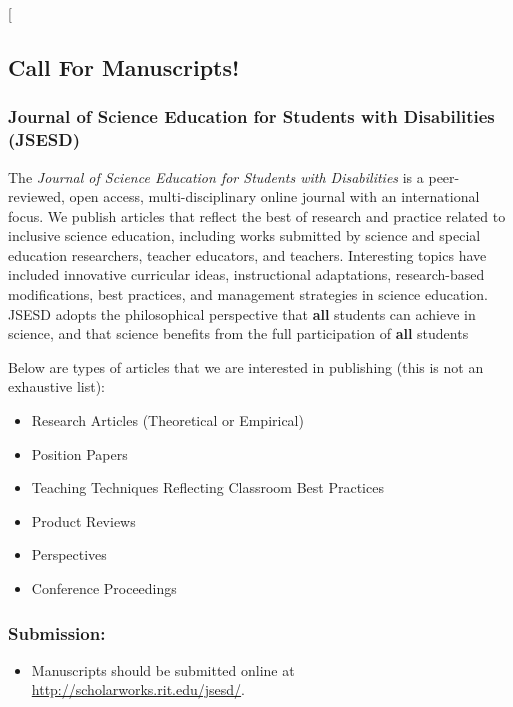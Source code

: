\documentclass[11pt]{sig-alternate}
\begin{document}
\twocolumn[
\begin{@twocolumnfalse}
\section*{Call For Manuscripts!}

\subsubsection*{Journal of Science Education for Students with Disabilities (JSESD)}

The \textit{Journal of Science Education for Students with Disabilities} is a peer-reviewed, open access, multi-disciplinary online journal with an international focus. We publish articles that reflect the best of research and practice related to inclusive science education, including works submitted by science and special education researchers, teacher educators, and teachers. Interesting topics have included innovative curricular ideas, instructional adaptations, research-based modifications, best practices, and management strategies in science education. JSESD adopts the philosophical perspective that \textbf{all} students can achieve in science, and that science benefits from the full participation of \textbf{all} students

Below are types of articles that we are interested in publishing (this is not an exhaustive list):

\begin{itemize}
    \item Research Articles (Theoretical or Empirical)
    \item Position Papers
    \item Teaching Techniques Reflecting Classroom Best Practices
    \item Product Reviews
    \item Perspectives
    \item Conference Proceedings
\end{itemize}

\subsubsection*{Submission:}
\begin{itemize}
    \item Manuscripts should be submitted online at \url{http://scholarworks.rit.edu/jsesd/}.
\end{itemize}


\end{@twocolumnfalse}
\end{document}
